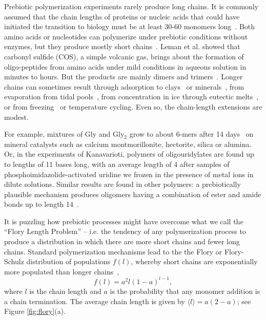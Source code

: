 \documentclass[twocolumn,letterpaper]{revtex4}
\begin{document}
Prebiotic polymerization experiments rarely produce long chains.  It is commonly assumed that the 
chain lengths of proteins or nucleic acids that could have initiated the transition to biology must 
be at least 30-60 monomers long~\cite{Szostak1993}.  
Both amino acids or nucleotides can polymerize under prebiotic conditions without enzymes, but 
they 
produce mostly short chains~\cite{Shock1992,Martin1998,PAECHT-HOROWITZ1970,Leman2004a,Orgel2004}.  
Leman et al. showed that carbonyl sulfide (COS), a simple volcanic gas, brings about the formation 
of oligo-peptides from amino acids under mild conditions in aqueous solution in minutes to hours. 
But the products are mainly dimers and trimers~\cite{Leman2004a}.  Longer chains can sometimes 
result through adsorption to clays~\cite{Rao1980,Lambert2008} or 
minerals~\cite{Bernal1949,Ferris1996}, from evaporation from tidal pools~\cite{Nelson2001}, from 
concentration in ice through eutectic melts~\cite{Kanavarioti2001}, or from 
freezing~\cite{Bada2004} or temperature cycling.  Even so, the chain-length extensions are modest. 
 
For example, mixtures of Gly and Gly$_2$ grow to about 6-mers after 14 
days~\cite{Rode1997,Rode1999} on mineral catalysts such as calcium montmorillonite, hectorite, 
silica or alumina.  Or, in the 
experiments of Kanavarioti, polymers of oligouridylates are found up to lengths of 11 bases long, 
with an average length of 4 \cite{Kanavarioti2001} after samples of phosphoimidazolide-activated 
uridine we frozen in the presence of metal ions in dilute solutions.  Similar results are found in 
other polymers: a prebiotically plausible mechanism produces oligomers having a combination of 
ester and amide bonds up to length 14~\cite{Forsythe2015}.  

It is puzzling how prebiotic processes might have overcome what we call the ``Flory Length 
Problem'' -- i.e. the tendency of any 
polymerization process to produce a distribution in which there are more short chains and fewer 
long chains.  Standard polymerization mechanisms lead to the the Flory or Flory-Schulz distribution 
of populations $f(l)$, whereby short chains are exponentially more populated than longer 
chains~\cite{Flory1953}, 
\begin{equation}
 f(l)=a^2l(1-a)^{l-1},\label{eq:flory}
\end{equation} 
where $l$ is the chain length and $a$ is the probability that any monomer addition is a chain 
termination.  The average chain length is given by $\langle l \rangle = a(2- a)$; see Figure 
\ref{fig:flory}(a).  
\end{document}
